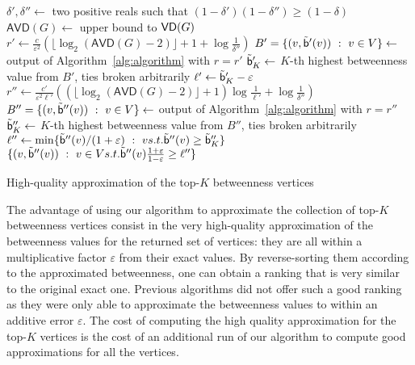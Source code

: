 \begin{algorithm}[h]
   \DontPrintSemicolon
  $\delta',\delta''\leftarrow$ two positive reals such that
  $(1-\delta')(1-\delta'')\ge(1-\delta)$\;
  $\mathsf{AVD}(G)\leftarrow$ upper bound to $\mathsf{VD}(G)$\;
  $r'\leftarrow\frac{c}{\varepsilon^2}\left(\lfloor\log_2(\mathsf{AVD}(G)-2)\rfloor+1+\log\frac{1}{\delta''}\right)$\;
  $B'=\{(v,\tilde{\mathsf{b}}'(v)) ~:~ v\in V\}\leftarrow$ output of Algorithm~\ref{alg:algorithm} with $r=r'$\;
  $\tilde{\mathsf{b}}_K'\leftarrow$ $K$-th highest betweenness value from $B'$, ties
  broken arbitrarily\;
  $\ell'\leftarrow\tilde{\mathsf{b}}_K'-\varepsilon$\;
  $r''\leftarrow\frac{c'}{\varepsilon^2\ell'}\left((\lfloor\log_2(\mathsf{AVD}(G)-2)\rfloor+1)\log\frac{1}{\ell'}+\log\frac{1}{\delta''}\right)$\;
  $B''=\{(v,\tilde{\mathsf{b}}''(v)) ~:~ v\in V\}\leftarrow$ output of
  Algorithm~\ref{alg:algorithm} with $r=r''$\;
  $\tilde{\mathsf{b}}_K''\leftarrow$ $K$-th highest betweenness value from $B''$, ties
  broken arbitrarily\;
  $\ell''\leftarrow\min\{\tilde{\mathsf{b}}''(v)/(1+\varepsilon) ~:~ v \relax{ s.t. }
  \tilde{\mathsf{b}}''(v)\ge\tilde{\mathsf{b}}_K''\}$\;
  \Return $\{(v,\tilde{\mathsf{b}}''(v)) ~:~ v\in V \relax{ s.t. }
  \tilde{\mathsf{b}}''(v)\frac{1+\varepsilon}{1-\varepsilon}\ge\ell''\}$\;
  \caption{High-quality approximation of the top-$K$ betweenness vertices}
  \label{alg:topk}
\end{algorithm}

The advantage of using our algorithm to approximate the collection of top-$K$
betweenness vertices consist in the very high-quality approximation of the
betweenness values for the returned set of vertices: they are all within a
multiplicative factor $\varepsilon$ from their exact values. By reverse-sorting
them according to the approximated betweenness, one can obtain a ranking that is
very similar to the original exact one. Previous algorithms did not offer such a
good ranking as they were only able to approximate the betweenness values to
within an additive error $\varepsilon$. The cost of computing the high quality
approximation for the top-$K$ vertices is the cost of an additional run of our
algorithm to compute good approximations for all the vertices.

